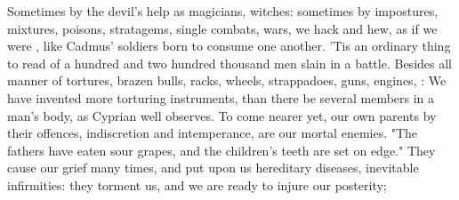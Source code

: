 Sometimes by the devil's help as magicians, witches:
sometimes by impostures, mixtures, poisons, stratagems, single combats, wars,
we hack and hew, as if we were , like Cadmus'
soldiers born to consume one another. 'Tis an ordinary thing to read of a
hundred and two hundred thousand men slain in a battle. Besides all manner of
tortures, brazen bulls, racks, wheels, strappadoes, guns, engines, \etc{}
:
We have invented more torturing instruments, than there be several members in a
man's body, as Cyprian well observes. To come nearer yet, our own parents by
their offences, indiscretion and intemperance, are our mortal enemies.
"The fathers have eaten sour grapes, and the children's
teeth are set on edge." They cause our grief many times, and put upon us
hereditary diseases, inevitable infirmities: they torment us, and we are ready
to injure our posterity;


